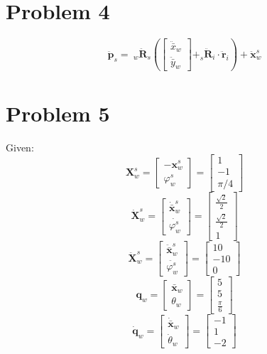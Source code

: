 \documentclass[10pt,letterpaper]{article}
\providecommand{\vect}[1]{\boldsymbol#1}
\providecommand{\mat}[1]{\mathbf#1}
\begin{document}
	\section*{Problem 4}
		\[
		\ddot{\vect{p}}_s =\ _w\ddot{\mat{R}}_s \left( \begin{bmatrix} \ddot{\bar{x}}_w \\ \ddot{\bar{y}}_w \end{bmatrix} +  _s\ddot{\mat{R}}_i \cdot \ddot{\vect{r}}_i \right) + \ddot{\vect{x}}^s_w
		\]
	\section*{Problem 5}	
Given:
	\[
	\vect{X}^s_w = \begin{bmatrix} -\vect{x}^s_w \\ \varphi^s_w \end{bmatrix} = \begin{bmatrix} 1 \\ -1 \\ \pi/4 \end{bmatrix}
	\]
	\[
	\dot{\vect{X}}^s_w = \begin{bmatrix} \dot{\bar{\vect{x}}}^s_w \\ \dot{\varphi^s_w} \end{bmatrix} = \begin{bmatrix} \frac{\sqrt{2}}{2} \\ \frac{\sqrt{2}}{2} \\ 1 \end{bmatrix}
	\]
	\[
	\ddot{\vect{X}}^s_w = \begin{bmatrix} \ddot{\bar{\vect{x}}}^s_w \\ \ddot{\varphi^s_w} \end{bmatrix} = \begin{bmatrix} 10 \\ -10 \\ 0 \end{bmatrix}
	\]
	\[
	\vect{q}_w = \begin{bmatrix} \bar{\vect{x}}_w \\ \theta_w \end{bmatrix} = \begin{bmatrix} 5 \\ 5 \\ \frac{\pi}{6} \end{bmatrix}
	\]
	\[
	\dot{\vect{q}}_w = \begin{bmatrix} \dot{\bar{\vect{x}}}_w \\ \dot{\theta}_w \end{bmatrix} = \begin{bmatrix} -1 \\ 1 \\ -2 \end{bmatrix}
	\]
\end{document}
